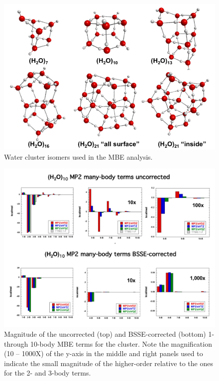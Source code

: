 \documentclass [11pt, proquest] {uwthesis}[2020/02/24]
\begin{document}
\begin{figure}[t]
\uwsinglespace
\begin{center}
\includegraphics[width=\textwidth]{Figures/Chapter_2/cluster_structures.png}
\end{center}
\label{fig:MBE_I_F1}
\caption[Generating a facing caption page]{Water cluster isomers used in the MBE analysis.}
\end{figure}

\begin{figure}[t]
\uwsinglespace
\begin{center}
\includegraphics[width=\textwidth]{Figures/Chapter_2/W10_MP2_MB.pdf}
\end{center}
\label{fig:MBE_I_F2}
\caption[temp]{Magnitude of the uncorrected (top) and BSSE-corrected (bottom) 1- through 10-body MBE terms for the  cluster. Note the magnification (10 – 1000X) of the y-axis in the middle and right panels used to indicate the small magnitude of the higher-order relative to the ones for the 2- and 3-body terms.}
\end{figure}
\end{document}
